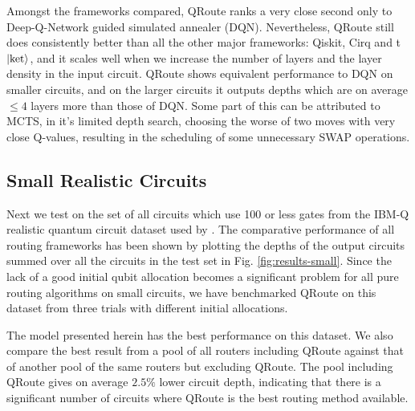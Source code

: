 Amongst the frameworks compared, QRoute ranks a very close second only to Deep-Q-Network guided simulated annealer (DQN). Nevertheless, QRoute still does consistently better than all the other major frameworks: Qiskit, Cirq and t$\ket{\text{ket}}$, and it scales well when we increase the number of layers and the layer density in the input circuit. QRoute shows equivalent performance to DQN on smaller circuits, and on the larger circuits it outputs depths which are on average $\leq 4$ layers more than those of DQN. Some part of this can be attributed to MCTS, in it's limited depth search, choosing the worse of two moves with very close Q-values, resulting in the scheduling of some unnecessary SWAP operations.


\subsection{\label{sec:results-small}Small Realistic Circuits}

Next we test on the set of all circuits which use 100 or less gates from the IBM-Q realistic quantum circuit dataset used by \cite{data_realistic}. The comparative performance of all routing frameworks has been shown by plotting the depths of the output circuits summed over all the circuits in the test set in Fig. \ref{fig:results-small}. Since the lack of a good initial qubit allocation becomes a significant problem for all pure routing algorithms on small circuits, we have benchmarked QRoute on this dataset from three trials with different initial allocations.

The model presented herein has the best performance on this dataset. We also compare the best result from a pool of all routers including QRoute against that of another pool of the same routers but excluding QRoute. The pool including QRoute gives on average $2.5\%$ lower circuit depth, indicating that there is a significant number of circuits where QRoute is the best routing method available.

